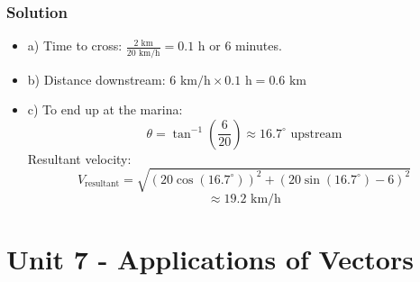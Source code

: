 \documentclass{article}
\begin{document}
\begin{multicols}{2}

\columnbreak

\subsubsection*{Solution}
\begin{itemize}
    \item a) Time to cross: \( \frac{2 \text{ km}}{20 \text{ km/h}} = 0.1 \text{ h} \) or 6 minutes.
    \item b) Distance downstream: \( 6 \text{ km/h} \times 0.1 \text{ h} = 0.6 \text{ km} \)
    \item c) To end up at the marina:
        \[
        \theta = \tan^{-1} \left( \frac{6}{20} \right) \approx 16.7^\circ \text{ upstream}
        \]
        Resultant velocity:
        \[
        V_{\text{resultant}} = \sqrt{(20 \cos(16.7^\circ))^2 + (20 \sin(16.7^\circ) - 6)^2} 
        \]
        \[
        \approx 19.2 \text{ km/h}
        \]
\end{itemize}

\end{multicols}
\newpage
\section{Unit 7 -  Applications of Vectors}
\end{document}
